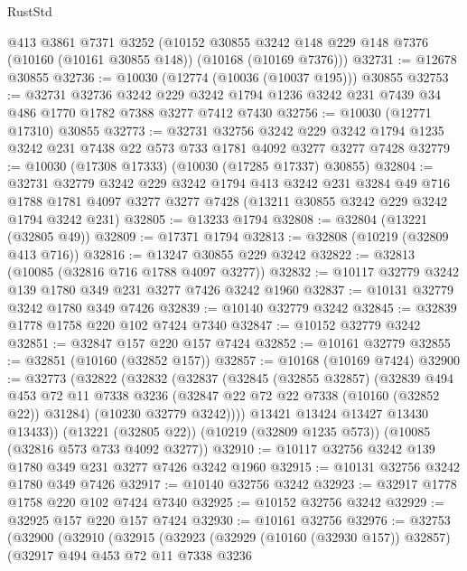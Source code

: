 \begin{lexlean}{RustStd}
\begin{coremodule}
    @413
    @3861
    @7371
    @3252
    (@10152 @30855 @3242 @148 @229 @148 @7376 (@10160 (@10161 @30855 @148)) (@10168 (@10169 @7376)))
@32731 := @12678 @30855
@32736 := @10030 (@12774 (@10036 (@10037 @195))) @30855
@32753 := @32731
    @32736
    @3242
    @229
    @3242
    @1794
    @1236
    @3242
    @231
    @7439
    @34
    @486
    @1770
    @1782
    @7388
    @3277
    @7412
    @7430
@32756 := @10030 (@12771 @17310) @30855
@32773 := @32731
    @32756
    @3242
    @229
    @3242
    @1794
    @1235
    @3242
    @231
    @7438
    @22
    @573
    @733
    @1781
    @4092
    @3277
    @3277
    @7428
@32779 := @10030 (@17308 @17333) (@10030 (@17285 @17337) @30855)
@32804 := @32731
    @32779
    @3242
    @229
    @3242
    @1794
    @413
    @3242
    @231
    @3284
    @49
    @716
    @1788
    @1781
    @4097
    @3277
    @3277
    @7428
    (@13211 @30855 @3242 @229 @3242 @1794 @3242 @231)
@32805 := @13233 @1794
@32808 := @32804 (@13221 (@32805 @49))
@32809 := @17371 @1794
@32813 := @32808 (@10219 (@32809 @413 @716))
@32816 := @13247 @30855 @229 @3242
@32822 := @32813 (@10085 (@32816 @716 @1788 @4097 @3277))
@32832 := @10117 @32779 @3242 @139 @1780 @349 @231 @3277 @7426 @3242 @1960
@32837 := @10131 @32779 @3242 @1780 @349 @7426
@32839 := @10140 @32779 @3242
@32845 := @32839 @1778 @1758 @220 @102 @7424 @7340
@32847 := @10152 @32779 @3242
@32851 := @32847 @157 @220 @157 @7424
@32852 := @10161 @32779
@32855 := @32851 (@10160 (@32852 @157))
@32857 := @10168 (@10169 @7424)
@32900 := @32773
    (@32822
      (@32832
        (@32837
          (@32845
            (@32855 @32857)
            (@32839
              @494
              @453
              @72
              @11
              @7338
              @3236
              (@32847 @22 @72 @22 @7338 (@10160 (@32852 @22)) @31284)
              (@10230 @32779 @3242))))
        @13421
        @13424
        @13427
        @13430
        @13433))
    (@13221 (@32805 @22))
    (@10219 (@32809 @1235 @573))
    (@10085 (@32816 @573 @733 @4092 @3277))
@32910 := @10117 @32756 @3242 @139 @1780 @349 @231 @3277 @7426 @3242 @1960
@32915 := @10131 @32756 @3242 @1780 @349 @7426
@32917 := @10140 @32756 @3242
@32923 := @32917 @1778 @1758 @220 @102 @7424 @7340
@32925 := @10152 @32756 @3242
@32929 := @32925 @157 @220 @157 @7424
@32930 := @10161 @32756
@32976 := @32753
    (@32900
      (@32910
        (@32915
          (@32923
            (@32929 (@10160 (@32930 @157)) @32857)
            (@32917
              @494
              @453
              @72
              @11
              @7338
              @3236

\end{coremodule}
\end{lexlean}

